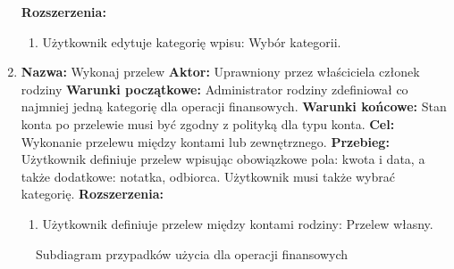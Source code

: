 \begin{enumerate}[labelwidth=1em,label=\arabic*.]
    \textbf{Rozszerzenia: } 
    \begin{enumerate}[label=\alph*)]
        \item Użytkownik edytuje kategorię wpisu: Wybór kategorii.
    \end{enumerate}
\item \textbf{Nazwa:} Wykonaj przelew \newline
    \textbf{Aktor:} Uprawniony przez właściciela członek rodziny \newline
    \textbf{Warunki początkowe:} Administrator rodziny zdefiniował co najmniej jedną kategorię dla operacji finansowych. \newline
    \textbf{Warunki końcowe:} Stan konta po przelewie musi być zgodny z polityką dla typu konta. \newline
    \textbf{Cel:} Wykonanie przelewu między kontami lub zewnętrznego. \newline
    \textbf{Przebieg:} Użytkownik definiuje przelew wpisując obowiązkowe pola: kwota i data, a także dodatkowe: notatka, odbiorca. Użytkownik musi także wybrać kategorię. \newline
    \textbf{Rozszerzenia: }
    \begin{enumerate}[label=\alph*)]
        \item Użytkownik definiuje przelew między kontami rodziny: Przelew własny.
    \end{enumerate}
\end{enumerate}

\begin{figure}[t]
	\centering
	\caption{Subdiagram przypadków użycia dla operacji finansowych}
	\label{fig:use-case-money}
\end{figure}

